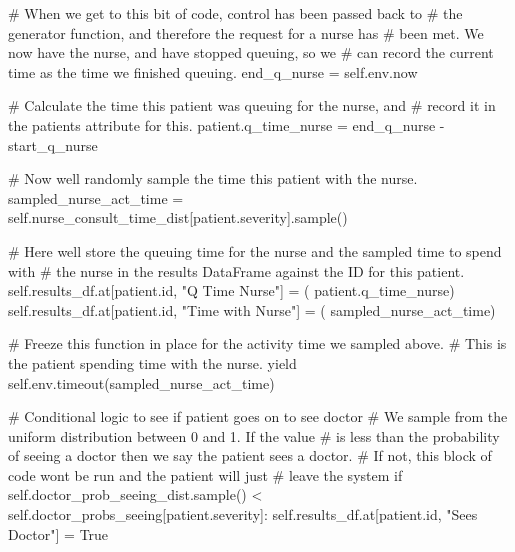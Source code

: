 \documentclass[
  letterpaper,
  DIV=11,
  numbers=noendperiod]{scrreprt}
\newenvironment{Shaded}{}{}
\newcommand{\BuiltInTok}[1]{\textcolor[rgb]{0.84,0.23,0.29}{#1}}
\newcommand{\CommentTok}[1]{\textcolor[rgb]{0.42,0.45,0.49}{#1}}
\newcommand{\ControlFlowTok}[1]{\textcolor[rgb]{0.84,0.23,0.29}{#1}}
\newcommand{\NormalTok}[1]{\textcolor[rgb]{0.14,0.16,0.18}{#1}}
\newcommand{\OperatorTok}[1]{\textcolor[rgb]{0.14,0.16,0.18}{#1}}
\newcommand{\StringTok}[1]{\textcolor[rgb]{0.01,0.18,0.38}{#1}}
\newcommand{\VariableTok}[1]{\textcolor[rgb]{0.89,0.38,0.04}{#1}}
\newcommand*\circled[1]{\tikz[baseline=(char.base)]{
          \node[shape=circle,draw,inner sep=1pt] (char) {{\scriptsize#1}};}}
\begin{document}
\begin{tcolorbox}
\begin{Shaded}
\begin{Highlighting}[]
            \CommentTok{\# When we get to this bit of code, control has been passed back to}
            \CommentTok{\# the generator function, and therefore the request for a nurse has}
            \CommentTok{\# been met.  We now have the nurse, and have stopped queuing, so we}
            \CommentTok{\# can record the current time as the time we finished queuing.}
\NormalTok{            end\_q\_nurse }\OperatorTok{=} \VariableTok{self}\NormalTok{.env.now}

            \CommentTok{\# Calculate the time this patient was queuing for the nurse, and}
            \CommentTok{\# record it in the patient\textquotesingle{}s attribute for this.}
\NormalTok{            patient.q\_time\_nurse }\OperatorTok{=}\NormalTok{ end\_q\_nurse }\OperatorTok{{-}}\NormalTok{ start\_q\_nurse}

            \CommentTok{\# Now we\textquotesingle{}ll randomly sample the time this patient with the nurse.}
\NormalTok{            sampled\_nurse\_act\_time }\OperatorTok{=} \VariableTok{self}\NormalTok{.nurse\_consult\_time\_dist[patient.severity].sample() }\hspace*{\fill}\NormalTok{\circled{1}}

            \CommentTok{\# Here we\textquotesingle{}ll store the queuing time for the nurse and the sampled time to spend with}
            \CommentTok{\# the nurse in the results DataFrame against the ID for this patient.}
            \VariableTok{self}\NormalTok{.results\_df.at[patient.}\BuiltInTok{id}\NormalTok{, }\StringTok{"Q Time Nurse"}\NormalTok{] }\OperatorTok{=}\NormalTok{ (}
\NormalTok{                patient.q\_time\_nurse)}
            \VariableTok{self}\NormalTok{.results\_df.at[patient.}\BuiltInTok{id}\NormalTok{, }\StringTok{"Time with Nurse"}\NormalTok{] }\OperatorTok{=}\NormalTok{ (}
\NormalTok{                sampled\_nurse\_act\_time)}

            \CommentTok{\# Freeze this function in place for the activity time we sampled above.}
            \CommentTok{\# This is the patient spending time with the nurse.}
            \ControlFlowTok{yield} \VariableTok{self}\NormalTok{.env.timeout(sampled\_nurse\_act\_time)}

        \CommentTok{\# Conditional logic to see if patient goes on to see doctor}
        \CommentTok{\# We sample from the uniform distribution between 0 and 1.  If the value}
        \CommentTok{\# is less than the probability of seeing a doctor then we say the patient sees a doctor.}
        \CommentTok{\# If not, this block of code won\textquotesingle{}t be run and the patient will just}
        \CommentTok{\# leave the system}
        \ControlFlowTok{if} \VariableTok{self}\NormalTok{.doctor\_prob\_seeing\_dist.sample() }\OperatorTok{\textless{}} \VariableTok{self}\NormalTok{.doctor\_probs\_seeing[patient.severity]: }
            \VariableTok{self}\NormalTok{.results\_df.at[patient.}\BuiltInTok{id}\NormalTok{, }\StringTok{"Sees Doctor"}\NormalTok{] }\OperatorTok{=} \VariableTok{True}


\end{Highlighting}
\end{Shaded}
\end{tcolorbox}
\end{document}
